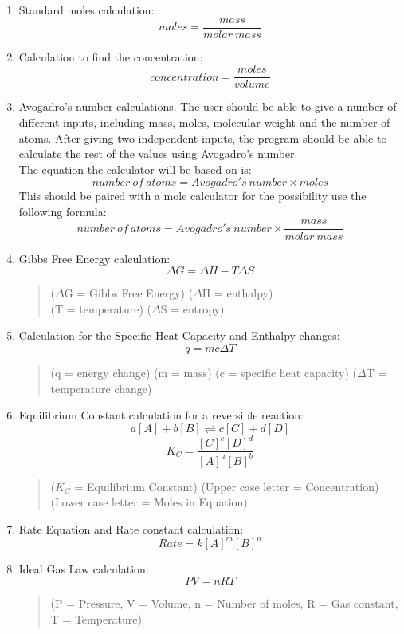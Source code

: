 \documentclass[a4paper,12pt]{article}
\begin{document}
\begin{enumerate}

\item Standard moles calculation:
\[moles=\frac{mass}{molar\: mass}\]

\item Calculation to find the concentration:
\[concentration=\frac{moles}{volume}\]

\newpage

\item Avogadro's number calculations. The user should be able to give a number of different inputs, including mass, moles, molecular weight and the number of atoms. After giving two independent inputs, the program should be able to calculate the rest of the values using Avogadro's number.\\
The equation the calculator will be based on is:
\[number\: of\: atoms = Avogadro's\: number \times moles\]
This should be paired with a mole calculator for the possibility use the following formula:
\[number\: of\: atoms = Avogadro's\: number \times \frac{mass}{molar\: mass}\]

\item Gibbs Free Energy calculation:
\[{\Delta}G = {\Delta}H - T{\Delta}S\]
\begin{quote}
(${\Delta}$G = Gibbs Free Energy) (${\Delta}$H = enthalpy)\\
(T = temperature) (${\Delta}$S = entropy)
\end{quote}

\item Calculation for the Specific Heat Capacity and Enthalpy changes:
\[q = mc {\Delta} T\]
\begin{quote}
(q = energy change) (m = mass) (c = specific heat capacity) (${\Delta}$T = temperature change)
\end{quote}

\item Equilibrium Constant calculation for a reversible reaction:
\[a[A] + b[B] \rightleftharpoons c[C] + d[D]\]
\[K_{C} = \frac{[C]^{c}[D]^{d}}{[A]^{a}[B]^{b}}\]
\begin{quote}
($K_{C}$ = Equilibrium Constant) (Upper case letter = Concentration) (Lower case letter = Moles in Equation)
\end{quote}

\item Rate Equation and Rate constant calculation:
\[Rate = k[A]^{m}[B]^{n}\]

\item Ideal Gas Law calculation:
\[PV = nRT\]
\begin{quote}
(P = Pressure, V = Volume, n = Number of moles, R = Gas constant, T = Temperature)
\end{quote}

\end{enumerate}
\end{document}
